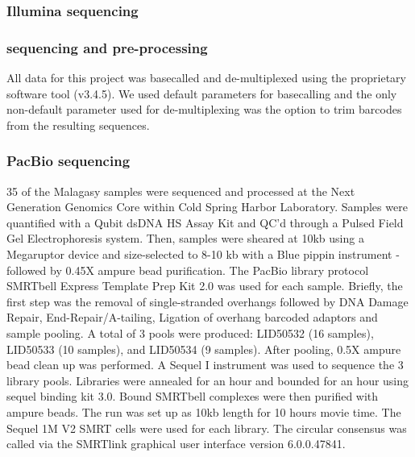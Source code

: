 \subsubsection{Illumina sequencing}


\subsubsection{\ont{} sequencing and pre-processing}


All \ont{} data for this project was basecalled and de-multiplexed using the \ont{} proprietary software tool \guppy{} (v3.4.5). We used default parameters for basecalling and the only non-default parameter used for de-multiplexing was the option to trim barcodes from the resulting sequences.  

\subsubsection{PacBio sequencing}
35 of the Malagasy samples were sequenced and processed at the Next Generation Genomics Core within Cold Spring Harbor Laboratory. Samples were quantified with a Qubit dsDNA HS Assay Kit and QC’d through a Pulsed Field Gel Electrophoresis system. Then, samples were sheared at 10kb using a Megaruptor device and size-selected to 8-10 kb with a Blue pippin instrument - followed by 0.45X ampure bead purification. The PacBio library protocol SMRTbell Express Template Prep Kit 2.0 was used for each sample. Briefly, the first step was the removal of single-stranded overhangs followed by DNA Damage Repair, End-Repair/A-tailing, Ligation of overhang barcoded adaptors and sample pooling. A total of 3 pools were produced: LID50532 (16 samples), LID50533 (10 samples), and LID50534 (9 samples). After pooling, 0.5X ampure bead clean up was performed. A Sequel I instrument was used to sequence the 3 library pools. Libraries were annealed for an hour and bounded for an hour using sequel binding kit 3.0. Bound SMRTbell complexes were then purified with ampure beads. The run was set up as 10kb length for 10 hours movie time. The Sequel 1M V2 SMRT cells were used for each library.  
The circular consensus was called via the SMRTlink graphical user interface version 6.0.0.47841.

